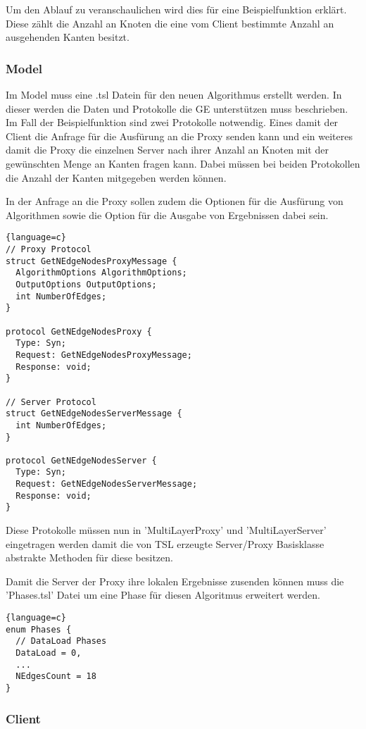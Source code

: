 Um den Ablauf zu veranschaulichen wird dies für eine Beispielfunktion erklärt. Diese zählt die Anzahl an Knoten die eine vom Client bestimmte Anzahl an ausgehenden Kanten besitzt.

\subsubsection{Model}

Im Model muss eine .tsl Datein für den neuen Algorithmus erstellt werden. In dieser werden die Daten und Protokolle die GE unterstützen muss beschrieben. Im Fall der Beispielfunktion sind zwei Protokolle notwendig.
Eines damit der Client die Anfrage für die Ausfürung an die Proxy senden kann und ein weiteres damit die Proxy die einzelnen Server nach ihrer Anzahl an Knoten mit der gewünschten Menge an Kanten fragen kann.
Dabei müssen bei beiden Protokollen die Anzahl der Kanten mitgegeben werden können.

In der Anfrage an die Proxy sollen zudem die Optionen für die Ausfürung von Algorithmen sowie die Option für die Ausgabe von Ergebnissen dabei sein.

\begin{lstlisting}{language=c}
// Proxy Protocol
struct GetNEdgeNodesProxyMessage {
  AlgorithmOptions AlgorithmOptions;
  OutputOptions OutputOptions;
  int NumberOfEdges;  
}

protocol GetNEdgeNodesProxy {
  Type: Syn;
  Request: GetNEdgeNodesProxyMessage;
  Response: void;
}

// Server Protocol
struct GetNEdgeNodesServerMessage {
  int NumberOfEdges;
}

protocol GetNEdgeNodesServer {
  Type: Syn;
  Request: GetNEdgeNodesServerMessage;
  Response: void;
}
\end{lstlisting}

Diese Protokolle müssen nun in 'MultiLayerProxy' und 'MultiLayerServer' eingetragen werden damit die von TSL erzeugte Server/Proxy Basisklasse abstrakte Methoden für diese besitzen.

Damit die Server der Proxy ihre lokalen Ergebnisse zusenden können muss die 'Phases.tsl' Datei um eine Phase für diesen Algoritmus erweitert werden.

\begin{lstlisting}{language=c}
enum Phases {
  // DataLoad Phases
  DataLoad = 0,
  ...
  NEdgesCount = 18
}
\end{lstlisting}


\subsubsection{Client}

